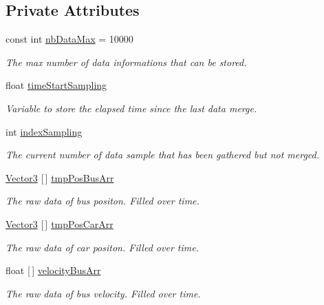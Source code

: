 \subsection*{Private Attributes}
\begin{DoxyCompactItemize}
\item 
const int \hyperlink{classmonitoring_ac4fadca0a90c03c7cd175155ead8df0f}{nb\+Data\+Max} = 10000
\begin{DoxyCompactList}\small\item\em The max number of data informations that can be stored.\end{DoxyCompactList}\item 
float \hyperlink{classmonitoring_a15b5bc6036048bde3e57edcbf53f6bc3}{time\+Start\+Sampling}
\begin{DoxyCompactList}\small\item\em Variable to store the elapsed time since the last data merge.\end{DoxyCompactList}\item 
int \hyperlink{classmonitoring_a6f24f8f72c806c9afab0e3de87636a27}{index\+Sampling}
\begin{DoxyCompactList}\small\item\em The current number of data sample that has been gathered but not merged.\end{DoxyCompactList}\item 
\hyperlink{classmonitoring_a4a225f8529921b2f6b38156cf3b296cf}{Vector3} \mbox{[}$\,$\mbox{]} \hyperlink{classmonitoring_a37b82c6f5aad1407bf7d68fa141d5c2e}{tmp\+Pos\+Bus\+Arr}
\begin{DoxyCompactList}\small\item\em The raw data of bus positon. Filled over time.\end{DoxyCompactList}\item 
\hyperlink{classmonitoring_a4a225f8529921b2f6b38156cf3b296cf}{Vector3} \mbox{[}$\,$\mbox{]} \hyperlink{classmonitoring_ac92542c319fc95a3b1126dba86a675de}{tmp\+Pos\+Car\+Arr}
\begin{DoxyCompactList}\small\item\em The raw data of car positon. Filled over time.\end{DoxyCompactList}\item 
float \mbox{[}$\,$\mbox{]} \hyperlink{classmonitoring_ade021e7adddbe127c8dd4413fac36483}{velocity\+Bus\+Arr}
\begin{DoxyCompactList}\small\item\em The raw data of bus velocity. Filled over time.\end{DoxyCompactList}\item 

\end{DoxyCompactItemize}
